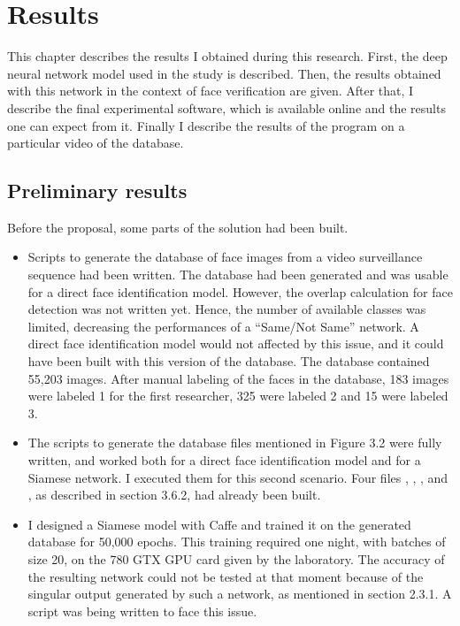 \setlength{\footskip}{8mm}

\chapter{Results}

\label{ch:results}

This chapter describes the results I obtained during this research.
First, the deep neural network model used in the study is described. Then, the results obtained with this network in the context of face verification are given. After that, I describe the final experimental software, which is available online and the results one can expect from it. Finally I describe the results of the program on a particular video of the database.

\section{Preliminary results}
Before the proposal, some parts of the solution had been built.
\begin{itemize}
\item Scripts to generate the database of face images from a video surveillance sequence had been written. The database had been generated and was usable for a direct face identification model. However, the overlap calculation for face detection was not written yet. Hence, the number of available classes was limited, decreasing the performances of a \enquote{Same/Not Same} network. A direct face identification model would not affected by this issue, and it could have been built with this version of the database. The database contained 55,203 images. After manual labeling of the faces in the database, 183 images were labeled 1 for the first researcher, 325 were labeled 2 and 15 were labeled 3.
\item The scripts to generate the database files mentioned in Figure 3.2 were fully written, and worked both for a direct face identification model and for a Siamese network. I executed them for this second scenario. Four files , , , and , as described in section 3.6.2, had already been built.
\item I designed a Siamese model with Caffe and trained it on the generated database for 50,000 epochs. This training required one night, with batches of size 20, on the 780 GTX GPU card given by the laboratory. The accuracy of the resulting network could not be tested at that moment because of the singular output generated by such a network, as mentioned in section 2.3.1. A script was being written to face this issue.
\end{itemize}

